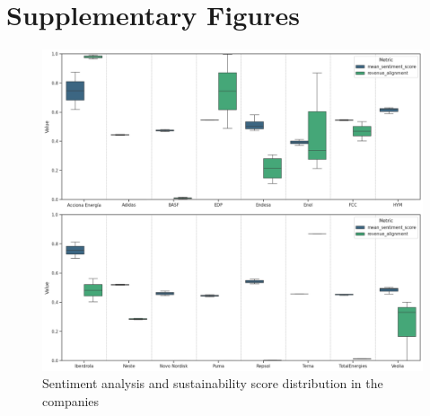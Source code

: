 \documentclass[times]{oupau}
\makeatletter
\renewcommand{\thefigure}{\textbf{\@arabic\c@figure}}
\makeatother
\begin{document}
\appendix
\clearpage
\section*{Supplementary Figures}

\setcounter{figure}{0} %
\renewcommand{\thefigure}{S\arabic{figure}}

\begin{figure} [h]
    \centering
    \includegraphics[width=1\linewidth]{boxplot1.png}
    \caption{Sentiment analysis and sustainability score distribution in the companies}
    \label{fig:enter-label}
\end{figure}
\end{document}
